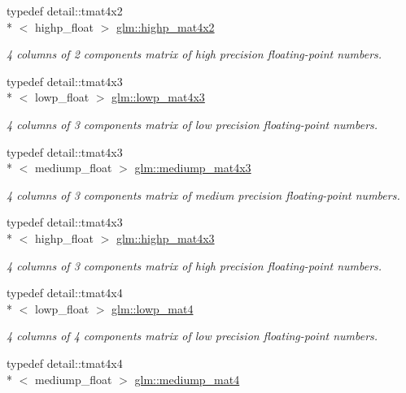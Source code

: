 \begin{DoxyCompactItemize}
typedef detail\-::tmat4x2\\*
$<$ highp\-\_\-float $>$ \hyperlink{group__core__precision_gaea696a76cb6e8c9b85ee9f0fd2e38a05}{glm\-::highp\-\_\-mat4x2}
\begin{DoxyCompactList}\small\item\em 4 columns of 2 components matrix of high precision floating-\/point numbers. \end{DoxyCompactList}\item 
typedef detail\-::tmat4x3\\*
$<$ lowp\-\_\-float $>$ \hyperlink{group__core__precision_ga072d9727aa59df856b83cfc01cb131bf}{glm\-::lowp\-\_\-mat4x3}
\begin{DoxyCompactList}\small\item\em 4 columns of 3 components matrix of low precision floating-\/point numbers. \end{DoxyCompactList}\item 
typedef detail\-::tmat4x3\\*
$<$ mediump\-\_\-float $>$ \hyperlink{group__core__precision_ga2c1b39d629d83063a0d59cf14b4f52a3}{glm\-::mediump\-\_\-mat4x3}
\begin{DoxyCompactList}\small\item\em 4 columns of 3 components matrix of medium precision floating-\/point numbers. \end{DoxyCompactList}\item 
typedef detail\-::tmat4x3\\*
$<$ highp\-\_\-float $>$ \hyperlink{group__core__precision_ga940a4f42a51d8dee13869ca90aa24df6}{glm\-::highp\-\_\-mat4x3}
\begin{DoxyCompactList}\small\item\em 4 columns of 3 components matrix of high precision floating-\/point numbers. \end{DoxyCompactList}\item 
typedef detail\-::tmat4x4\\*
$<$ lowp\-\_\-float $>$ \hyperlink{group__core__precision_ga39e75439a03361f4407feab2e2eb5f93}{glm\-::lowp\-\_\-mat4}
\begin{DoxyCompactList}\small\item\em 4 columns of 4 components matrix of low precision floating-\/point numbers. \end{DoxyCompactList}\item 
typedef detail\-::tmat4x4\\*
$<$ mediump\-\_\-float $>$ \hyperlink{group__core__precision_gabd9b3a319a914cd49dab821d4dbc93d4}{glm\-::mediump\-\_\-mat4}

\end{DoxyCompactItemize}

